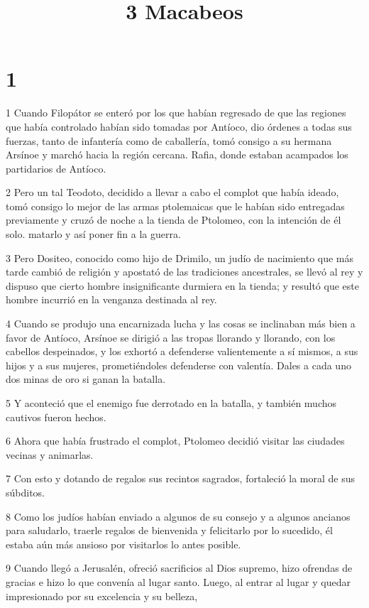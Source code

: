 

\title{3 Macabeos}


\chapter{1}

\par 1 Cuando Filopátor se enteró por los que habían regresado de que las regiones que había controlado habían sido tomadas por Antíoco, dio órdenes a todas sus fuerzas, tanto de infantería como de caballería, tomó consigo a su hermana Arsínoe y marchó hacia la región cercana. Rafia, donde estaban acampados los partidarios de Antíoco.
\par 2 Pero un tal Teodoto, decidido a llevar a cabo el complot que había ideado, tomó consigo lo mejor de las armas ptolemaicas que le habían sido entregadas previamente y cruzó de noche a la tienda de Ptolomeo, con la intención de él solo. matarlo y así poner fin a la guerra.
\par 3 Pero Dositeo, conocido como hijo de Drimilo, un judío de nacimiento que más tarde cambió de religión y apostató de las tradiciones ancestrales, se llevó al rey y dispuso que cierto hombre insignificante durmiera en la tienda; y resultó que este hombre incurrió en la venganza destinada al rey.
\par 4 Cuando se produjo una encarnizada lucha y las cosas se inclinaban más bien a favor de Antíoco, Arsínoe se dirigió a las tropas llorando y llorando, con los cabellos despeinados, y los exhortó a defenderse valientemente a sí mismos, a sus hijos y a sus mujeres, prometiéndoles defenderse con valentía. Dales a cada uno dos minas de oro si ganan la batalla.
\par 5 Y aconteció que el enemigo fue derrotado en la batalla, y también muchos cautivos fueron hechos.
\par 6 Ahora que había frustrado el complot, Ptolomeo decidió visitar las ciudades vecinas y animarlas.
\par 7 Con esto y dotando de regalos sus recintos sagrados, fortaleció la moral de sus súbditos.
\par 8 Como los judíos habían enviado a algunos de su consejo y a algunos ancianos para saludarlo, traerle regalos de bienvenida y felicitarlo por lo sucedido, él estaba aún más ansioso por visitarlos lo antes posible.
\par 9 Cuando llegó a Jerusalén, ofreció sacrificios al Dios supremo, hizo ofrendas de gracias e hizo lo que convenía al lugar santo. Luego, al entrar al lugar y quedar impresionado por su excelencia y su belleza,
